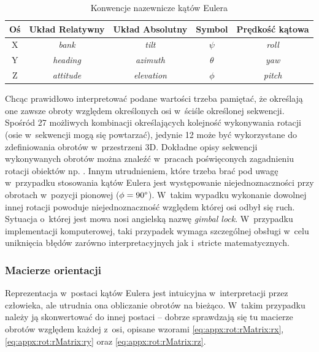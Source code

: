 \begin{table}
	\centering
	\caption{Konwencje nazewnicze kątów Eulera}
	\label{tab:appx:rot:eulerNames} 
	\begin{tabular}{|c|c|c|c|c|}
		\hline
		Oś & Układ Relatywny & Układ Absolutny & Symbol   & Prędkość kątowa \\
		\hline
		X   & \emph{bank}      & \emph{tilt}      & $\psi$   & \emph{roll}         \\
		Y   & \emph{heading}   & \emph{azimuth}   & $\theta$ & \emph{yaw}          \\ 
		Z   & \emph{attitude}  & \emph{elevation} & $\phi$   & \emph{pitch}        \\
		\hline
	\end{tabular} 
\end{table}
		
Chcąc prawidłowo interpretować podane wartości trzeba pamiętać, że określają one zawsze obroty względem określonych osi w~ściśle określonej sekwencji. Spośród 27 możliwych kombinacji określających kolejność wykonywania rotacji (osie w~sekwencji mogą się powtarzać), jedynie 12 może być wykorzystane do zdefiniowania obrotów w~przestrzeni 3D. Dokładne opisy sekwencji wykonywanych obrotów można znaleźć w~pracach poświęconych zagadnieniu rotacji obiektów np. \cite{Pio1966, Diebel2006}. Innym utrudnieniem, które trzeba brać pod uwagę w~przypadku stosowania kątów Eulera jest występowanie niejednoznaczności przy obrotach w~pozycji pionowej ($ \phi=90\degree $). W~takim wypadku wykonanie dowolnej innej rotacji powoduje niejednoznaczność względem której osi odbył się ruch. Sytuacja o~której jest mowa nosi angielską nazwę \emph{gimbal lock}. W~przypadku implementacji komputerowej, taki przypadek wymaga szczególnej obsługi w~celu uniknięcia błędów zarówno interpretacyjnych jak i~stricte matematycznych.
		
\subsubsection*{Macierze orientacji}
Reprezentacja w~postaci kątów Eulera jest intuicyjna w~interpretacji przez człowieka, ale utrudnia ona obliczanie obrotów na bieżąco. W~takim przypadku należy ją skonwertować do innej postaci -- dobrze sprawdzają się tu macierze obrotów względem każdej z~osi, opisane wzorami \eqref{eq:appx:rot:rMatrix:rx}, \eqref{eq:appx:rot:rMatrix:ry} oraz \eqref{eq:appx:rot:rMatrix:rz}.
		
